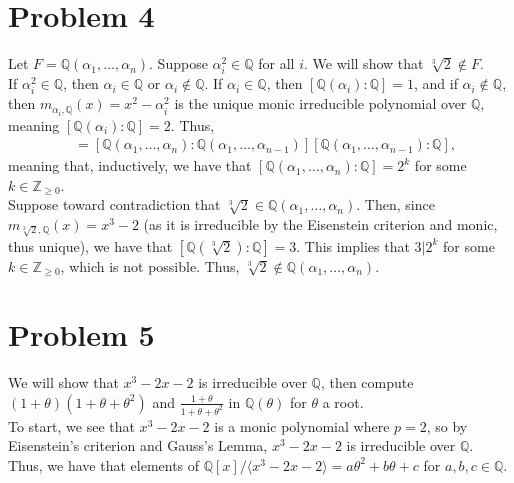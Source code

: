 \documentclass[11pt]{extarticle}
\newcommand{\Q}{\mathbb{Q}}
\newcommand{\Z}{\mathbb{Z}}
\begin{document}
  \section{Problem 4}%
  Let $F = \Q(\alpha_1,\dots,\alpha_n)$. Suppose $\alpha_i^2\in \Q$ for all $i$. We will show that $\sqrt[3]{2}\notin F$.\\

  If $\alpha_i^2\in \Q$, then $\alpha_i \in \Q$ or $\alpha_i \notin \Q$. If $\alpha_i \in \Q$, then $[\Q(\alpha_i):\Q] = 1$, and if $\alpha_i \notin \Q$, then $m_{\alpha_i,\Q}(x) = x^2 - \alpha_i^2$ is the unique monic irreducible polynomial over $\Q$, meaning $[\Q(\alpha_i):\Q] = 2$. Thus,
  \begin{align*}
    [\Q(\alpha_1,\dots,\alpha_n):\Q] &= [\Q(\alpha_1,\dots,\alpha_n):\Q(\alpha_1,\dots,\alpha_{n-1})][\Q(\alpha_1,\dots,\alpha_{n-1}):\Q],
  \end{align*}
  meaning that, inductively, we have that $[\Q(\alpha_1,\dots,\alpha_n):\Q] = 2^{k}$ for some $k\in \Z_{\geq 0}$.\\

  Suppose toward contradiction that $\sqrt[3]{2}\in \Q(\alpha_1,\dots,\alpha_n)$. Then, since $m_{\sqrt[3]{2},\Q}(x) = x^3 - 2$ (as it is irreducible by the Eisenstein criterion and monic, thus unique), we have that $[\Q(\sqrt[3]{2}):\Q] = 3$. This implies that $3|2^{k}$ for some $k\in \Z_{\geq 0}$, which is not possible. Thus, $\sqrt[3]{2}\notin \Q(\alpha_1,\dots,\alpha_n)$.
  \section{Problem 5}%
  We will show that $x^3 - 2x - 2$ is irreducible over $\Q$, then compute $(1+\theta)(1+\theta + \theta^2)$ and $\frac{1+\theta}{1+\theta+\theta^2}$ in $\Q(\theta)$ for $\theta$ a root.\\

  To start, we see that $x^3 - 2x - 2$ is a monic polynomial where $p = 2$, so by Eisenstein's criterion and Gauss's Lemma, $x^3 - 2x - 2$ is irreducible over $\Q$. Thus, we have that elements of $\Q[x]/\langle x^3 - 2x - 2\rangle = a\theta^2 + b\theta + c$ for $a,b,c\in \Q$.\\
\end{document}
